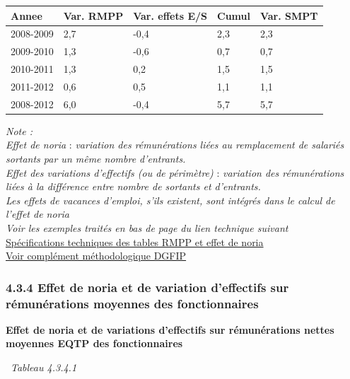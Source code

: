 \begin{longtable}[]{@{}lllll@{}}
\toprule
Annee & Var. RMPP & Var. effets E/S & Cumul & Var. SMPT\tabularnewline
\midrule
\endhead
2008-2009 & 2,7 & -0,4 & 2,3 & 2,3\tabularnewline
2009-2010 & 1,3 & -0,6 & 0,7 & 0,7\tabularnewline
2010-2011 & 1,3 & 0,2 & 1,5 & 1,5\tabularnewline
2011-2012 & 0,6 & 0,5 & 1,1 & 1,1\tabularnewline
2008-2012 & 6,0 & -0,4 & 5,7 & 5,7\tabularnewline
\bottomrule
\end{longtable}

\emph{Note :}\\
\emph{Effet de noria} : \emph{variation des rémunérations liées au
remplacement de salariés sortants par un même nombre d'entrants.}\\
\emph{Effet des variations d'effectifs (ou de périmètre)} :
\emph{variation des rémunérations liées à la différence entre nombre de
sortants et d'entrants.}\\
\emph{Les effets de vacances d'emploi, s'ils existent, sont intégrés
dans le calcul de l'effet de noria}\\
\emph{Voir les exemples traités en bas de page du lien technique
suivant}\\
\href{../Docs/Notices/noria.html}{Spécifications techniques des tables RMPP
et effet de noria}\\
\href{../Docs/Notices/GVT\%20et\%20noria.pdf}{Voir complément
méthodologique DGFIP}

\hypertarget{effet-de-noria-et-de-variation-deffectifs-sur-remunerations-moyennes-des-fonctionnaires}{%
\subsubsection{4.3.4 Effet de noria et de variation d'effectifs sur
rémunérations moyennes des
fonctionnaires}\label{effet-de-noria-et-de-variation-deffectifs-sur-remunerations-moyennes-des-fonctionnaires}}

\textbf{Effet de noria et de variations d'effectifs sur rémunérations
nettes moyennes EQTP des fonctionnaires}

~\emph{Tableau 4.3.4.1}

